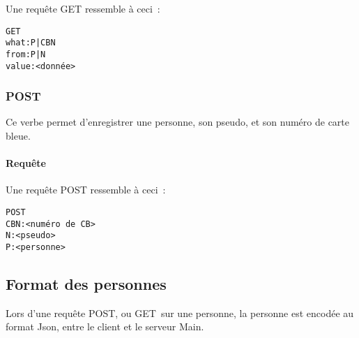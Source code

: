 \documentclass[a4paper,11pt,french]{article}
\begin{document}
            Une requête GET ressemble à ceci~:
            
            \begin{verbatim}
GET
what:P|CBN
from:P|N
value:<donnée>
            \end{verbatim}
            
            
            
      \subsubsection{POST}
      
         Ce verbe permet d'enregistrer une personne, son pseudo, et son numéro
         de carte bleue.
         
         \paragraph{Requête}
         
         Une requête POST ressemble à ceci~:

         \begin{verbatim}
POST
CBN:<numéro de CB>
N:<pseudo>
P:<personne>
         \end{verbatim}
	
	   \subsection{Format des personnes}
	      Lors d'une requête POST, ou GET sur une personne, la personne est
	      encodée au format Json, entre le client et le serveur Main.
	
	\section{}
	
\end{document}
